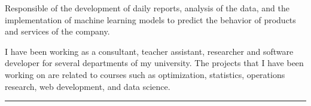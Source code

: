 \documentclass[]{rahulworld-resume}
\begin{document}
\begin{minipage}[t]{0.66\textwidth}
\begin{minipage}{0.85\textwidth\vspace{2pt}}
    \end{minipage}

    \noindent
    \hspace{5em}%
    \begin{minipage}{0.85\textwidth\vspace{2pt}} Responsible of the development of
        daily reports, analysis of the data, and the implementation of machine learning
        models to predict the behavior of products and services of the company.
    \end{minipage}
    \sectionsep


    \noindent
    \hspace{5em}%
    \begin{minipage}{0.85\textwidth\vspace{2pt}} I have been working as a
        consultant, teacher assistant, researcher and software developer for several
        departments of my university. The projects that I have been working on are
        related to courses such as optimization, statistics, operations
        research, web development, and data science.
    \end{minipage}
    \noindent\rule{12.5cm}{0.4pt}
    \sectionsep






\end{minipage}
\end{document}
